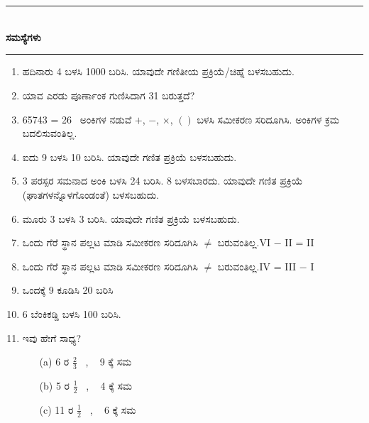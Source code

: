 \chapter[ಅಧ್ಯಾಯ 4]{}\label{chap4}

\begin{center}
\rule{5cm}{1pt}\\[5pt]
{\Large\bfseries ಸಮಸ್ಯೆಗಳು}\\[3pt]
\rule{5cm}{1pt}
\end{center}

\smallskip
\begin{enumerate}
\renewcommand{\labelenumi}{\bf\theenumi.}
\itemsep=5pt

\item ಹದಿನಾರು 4 ಬಳಸಿ 1000 ಬರಿಸಿ. ಯಾವುದೇ ಗಣಿತೀಯ ಪ್ರಕ್ರಿಯೆ/ಚಿಹ್ನೆ ಬಳಸಬಹುದು.

\item ಯಾವ ಎರಡು ಪೂರ್ಣಾಂಕ ಗುಣಿಸಿದಾಗ 31 ಬರುತ್ತದೆ?

\item 65743 = 26~ ಅಂಕಿಗಳ ನಡುವೆ $+$, $-$, $\times$, $()$ ಬಳಸಿ ಸಮೀಕರಣ ಸರಿದೂಗಿಸಿ. ಅಂಕಿಗಳ ಕ್ರಮ ಬದಲಿಸುವಂತಿಲ್ಲ.

\item ಐದು 9 ಬಳಸಿ 10 ಬರಿಸಿ. ಯಾವುದೇ ಗಣಿತ ಪ್ರಕ್ರಿಯೆ ಬಳಸಬಹುದು. 

\item 3 ಪರಸ್ಪರ ಸಮನಾದ ಅಂಕಿ ಬಳಸಿ 24 ಬರಿಸಿ. 8 ಬಳಸಬಾರದು. ಯಾವುದೇ ಗಣಿತ ಪ್ರಕ್ರಿಯೆ (ಘಾತಗಳನ್ನೊಳಗೊಂಡಂತೆ) ಬಳಸಬಹುದು.

\item ಮೂರು 3 ಬಳಸಿ 3 ಬರಿಸಿ. ಯಾವುದೇ ಗಣಿತ ಪ್ರಕ್ರಿಯೆ ಬಳಸಬಹುದು.

\item ಒಂದು ಗೆರೆ ಸ್ಥಾನ ಪಲ್ಲಟ ಮಾಡಿ ಸಮೀಕರಣ ಸರಿದೂಗಿಸಿ $\neq$ ಬರುವಂತಿಲ್ಲ.\break VI $-$ II = II

\item ಒಂದು ಗೆರೆ ಸ್ಥಾನ ಪಲ್ಲಟ ಮಾಡಿ ಸಮೀಕರಣ ಸರಿದೂಗಿಸಿ $\neq$ ಬರುವಂತಿಲ್ಲ.\break IV = III $-$ I

\item ಒಂದಕ್ಕೆ 9 ಕೂಡಿಸಿ 20 ಬರಿಸಿ

\item 6 ಬೆಂಕಿಕಡ್ಡಿ  ಬಳಸಿ 100 ಬರಿಸಿ. 

\eject

\item ಇವು ಹೇಗೆ ಸಾಧ್ಯ?
\begin{itemize}
\itemsep=2pt

\item[(a)] 6 ರ $\frac{2}{3}$~ , ~ 9 ಕ್ಕೆ ಸಮ 
\item[(b)] 5 ರ $\frac{1}{2}$~ , ~ 4 ಕ್ಕೆ ಸಮ
\item[(c)] 11 ರ $\frac{1}{2}$~ , ~ 6 ಕ್ಕೆ ಸಮ
\end{itemize}


\end{enumerate}
